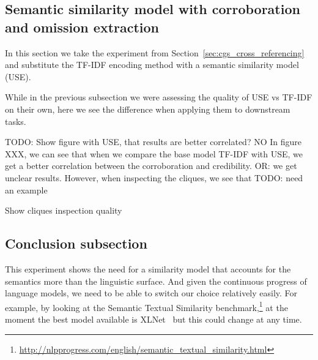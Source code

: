 
\subsection{Semantic similarity model with corroboration and omission extraction}

In this section we take the experiment from Section~\ref{sec:cgs_cross_referencing} and substitute the TF-IDF encoding method with a semantic similarity model (USE).

While in the previous subsection we were assessing the quality of USE vs TF-IDF on their own, here we see the difference when applying them to downstream tasks.

TODO: Show figure with USE, that results are better correlated? NO
In figure XXX, we can see that when we compare the base model TF-IDF with USE, we get a better correlation between the corroboration and credibility.
OR: we get unclear results. However, when inspecting the cliques, we see that 
TODO: need an example

Show cliques inspection quality


\subsection{Conclusion subsection}

This experiment shows the need for a similarity model that accounts for the semantics more than the linguistic surface. And given the continuous progress of language models, we need to be able to switch our choice relatively easily.
For example, by looking at the Semantic Textual Similarity benchmark,\footnote{\url{http://nlpprogress.com/english/semantic_textual_similarity.html}} at the moment the best model available is XLNet~\citep{yang2019xlnet} but this could change at any time.



